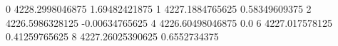 0 4228.2998046875 1.69482421875
1 4227.1884765625 0.58349609375
2 4226.5986328125 -0.00634765625
4 4226.60498046875 0.0
6 4227.017578125 0.41259765625
8 4227.26025390625 0.6552734375

